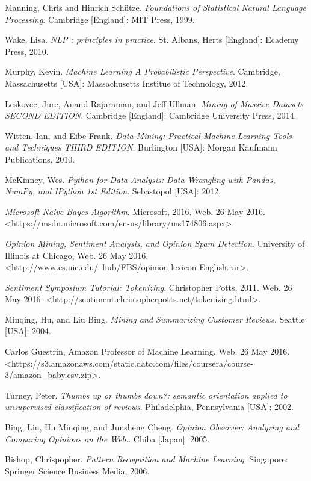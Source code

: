 \documentclass[12pt]{report}
\begin{document}
\begin{thebibliography}{9}

 Manning, Chris and Hinrich Sch{\"u}tze. \textit{Foundations of Statistical Natural Language Processing}. Cambridge [England]: MIT Press, 1999.

 Wake, Lisa. \textit{NLP : principles in practice}. St. Albans, Herts [England]: Ecademy Press, 2010.

 Murphy, Kevin. \textit{Machine Learning A Probabilistic Perspective}. Cambridge, Massachusetts [USA]: Massachusetts Institue of Technology, 2012.

 Leskovec, Jure, Anand Rajaraman, and Jeff Ullman. \textit{Mining of Massive Datasets SECOND EDITION}. Cambridge [England]: Cambridge University Press, 2014.

 Witten, Ian, and Eibe Frank. \textit{Data Mining: Practical Machine Learning Tools and Techniques THIRD EDITION}. Burlington [USA]: Morgan Kaufmann Publications, 2010.

 McKinney, Wes. \textit{Python for Data Analysis: Data Wrangling with Pandas, NumPy, and IPython 1st Edition}. Sebastopol [USA]: 2012.

 \textit{Microsoft Naive Bayes Algorithm}. Microsoft, 2016. Web. 26 May 2016. <https://msdn.microsoft.com/en-us/library/ms174806.aspx>.

 \textit{Opinion Mining, Sentiment Analysis, and Opinion Spam Detection}. University of Illinois at Chicago, Web. 26 May 2016. <http://www.cs.uic.edu/~liub/FBS/opinion-lexicon-English.rar>.

 \textit{Sentiment Symposium Tutorial: Tokenizing}. Christopher Potts, 2011. Web. 26 May 2016. <http://sentiment.christopherpotts.net/tokenizing.html>.

 Minqing, Hu, and Liu Bing. \textit{Mining and Summarizing Customer Reviews}. Seattle [USA]: 2004.

 Carlos Guestrin, Amazon Professor of Machine Learning. Web. 26 May 2016. <https://s3.amazonaws.com/static.dato.com/files/coursera/course-3/amazon\_baby.csv.zip>.

 Turney, Peter. \textit{Thumbs up or thumbs down?: semantic orientation applied to unsupervised classification of reviews}. Philadelphia, Pennsylvania [USA]: 2002.

 Bing, Liu, Hu Minqing, and Junsheng Cheng. \textit{Opinion Observer: Analyzing and Comparing Opinions on the Web.}. Chiba [Japan]: 2005.

 Bishop, Chrispopher. \textit{Pattern Recognition and Machine Learning}. Singapore: Springer Science Business Media, 2006.

\end{thebibliography}
\end{document}
